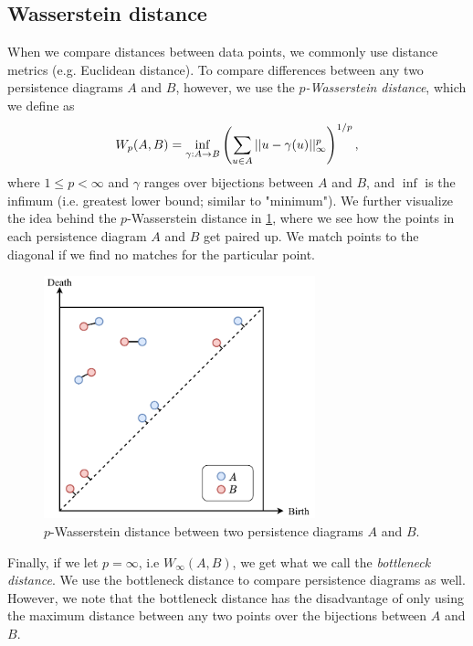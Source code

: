 \subsection{Wasserstein distance}
\label{sec:wasserstein-distance}
When we compare distances between data points, we commonly use distance metrics (e.g. Euclidean distance). To compare differences between any two persistence diagrams $A$ and $B$, however, we use the $p$\textit{-Wasserstein distance}, which we define as
\begin{align}
    W_p(A, B) = \inf_{\gamma: A \rightarrow B} \left(\sum\limits_{u \in A}^{} ||u - \gamma(u)||_{\infty}^{p}\right)^{1/p},
    \label{eqn:wasserstein-distance}
\end{align}
where $1 \leq p < \infty$ and $\gamma$ ranges over bijections between $A$ and $B$, and $\inf$ is the infimum (i.e. greatest lower bound; similar to "minimum"). We further visualize the idea behind the $p$-Wasserstein distance in \cref{fig:wasserstein-distance-example}, where we see how the points in each persistence diagram $A$ and $B$ get paired up. We match points to the diagonal if we find no matches for the particular point.
\begin{figure}[H]
    \centering
    \includegraphics[width=0.7\textwidth]{thesis/figures/wasserstein-distance_cropped.pdf}
    \caption{$p$-Wasserstein distance between two persistence diagrams $A$ and $B$.}
    \label{fig:wasserstein-distance-example}
\end{figure}
Finally, if we let $p=\infty$, i.e $W_\infty(A, B)$, we get what we call the \textit{bottleneck distance}. We use the bottleneck distance to compare persistence diagrams as well. However, we note that the bottleneck distance has the disadvantage of only using the maximum distance between any two points over the bijections between $A$ and $B$.

